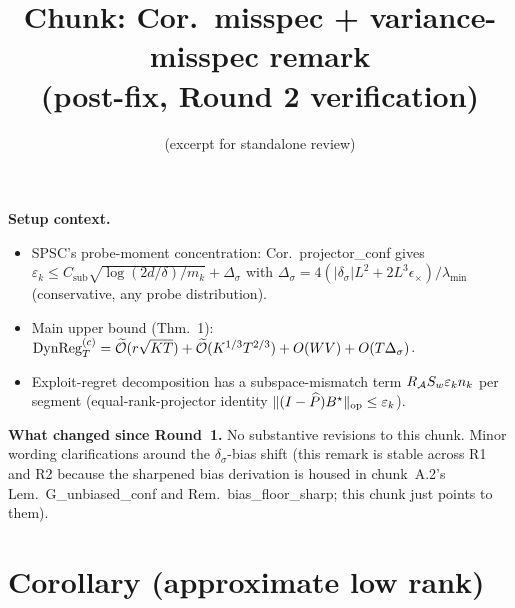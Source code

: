 

\title{Chunk: Cor.\ misspec + variance-misspec remark\\(post-fix, Round 2 verification)}
\author{(excerpt for standalone review)}
\date{}


\maketitle

\textbf{Setup context.}
\begin{itemize}[leftmargin=*,itemsep=1pt,topsep=1pt]
\item SPSC's probe-moment concentration: Cor.\ projector\_conf gives
$\varepsilon_k\le C_{\mathrm{sub}}\sqrt{\log(2d/\delta)/m_k}+\Delta_\sigma$
with $\Delta_\sigma=4(|\delta_\sigma|L^2+2L^3\epsilon_\times)/\lambda_{\min}$
(conservative, any probe distribution).
\item Main upper bound (Thm.\ 1):
$\mathrm{DynReg}_T^{(c)}=\widetilde{\mathcal{O}}(r\sqrt{KT})+\widetilde{\mathcal{O}}(K^{1/3}T^{2/3})+O(WV)+O(T\Delta_\sigma)$.
\item Exploit-regret decomposition has a subspace-mismatch term
$R_{\mathcal{A}} S_w\varepsilon_k n_k$ per segment (equal-rank-projector identity
$\|(I-\widehat P)B^\star\|_{\mathrm{op}}\le\varepsilon_k$).
\end{itemize}

\textbf{What changed since Round~1.} No substantive revisions to this
chunk. Minor wording clarifications around the $\delta_\sigma$-bias
shift (this remark is stable across R1 and R2 because the sharpened
bias derivation is housed in chunk~A.2's Lem.~G\_unbiased\_conf and
Rem.~bias\_floor\_sharp; this chunk just points to them).

\section*{Corollary (approximate low rank)}

